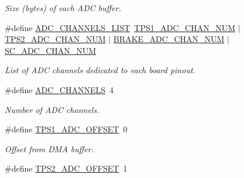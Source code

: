 \begin{DoxyCompactItemize}
\begin{DoxyCompactList}\small\item\em Size (bytes) of each A\-D\-C buffer. \end{DoxyCompactList}\item 
\hypertarget{group___board__model__group_ga8b6fbd5b46174be3b86bc1ab5daa9080}{\#define \hyperlink{group___board__model__group_ga8b6fbd5b46174be3b86bc1ab5daa9080}{A\-D\-C\-\_\-\-C\-H\-A\-N\-N\-E\-L\-S\-\_\-\-L\-I\-S\-T}~\hyperlink{group___board__model__group_ga99b2a7dadaf495e3c559a46440f9141f}{T\-P\-S1\-\_\-\-A\-D\-C\-\_\-\-C\-H\-A\-N\-\_\-\-N\-U\-M} $|$ \hyperlink{group___board__model__group_ga4cecb8c10512873904099a1a88d69ed3}{T\-P\-S2\-\_\-\-A\-D\-C\-\_\-\-C\-H\-A\-N\-\_\-\-N\-U\-M} $|$ \hyperlink{group___board__model__group_ga310547321c4a016c4ad19922920fadfd}{B\-R\-A\-K\-E\-\_\-\-A\-D\-C\-\_\-\-C\-H\-A\-N\-\_\-\-N\-U\-M} $|$ \hyperlink{group___board__model__group_ga564adb575db2620ac85e3abdd6a5bbaf}{S\-C\-\_\-\-A\-D\-C\-\_\-\-C\-H\-A\-N\-\_\-\-N\-U\-M}}\label{group___board__model__group_ga8b6fbd5b46174be3b86bc1ab5daa9080}

\begin{DoxyCompactList}\small\item\em List of A\-D\-C channels dedicated to each board pinout. \end{DoxyCompactList}\item 
\hypertarget{group___board__model__group_ga065dcfa648ca52ed6214008cb177de36}{\#define \hyperlink{group___board__model__group_ga065dcfa648ca52ed6214008cb177de36}{A\-D\-C\-\_\-\-C\-H\-A\-N\-N\-E\-L\-S}~4}\label{group___board__model__group_ga065dcfa648ca52ed6214008cb177de36}

\begin{DoxyCompactList}\small\item\em Number of A\-D\-C channels. \end{DoxyCompactList}\item 
\hypertarget{group___board__model__group_ga7ce02d79fba23321a377a26a963e2bdf}{\#define \hyperlink{group___board__model__group_ga7ce02d79fba23321a377a26a963e2bdf}{T\-P\-S1\-\_\-\-A\-D\-C\-\_\-\-O\-F\-F\-S\-E\-T}~0}\label{group___board__model__group_ga7ce02d79fba23321a377a26a963e2bdf}

\begin{DoxyCompactList}\small\item\em Offset from D\-M\-A buffer. \end{DoxyCompactList}\item 
\hypertarget{group___board__model__group_ga24019e59e805c7acf8f816e141d3d689}{\#define \hyperlink{group___board__model__group_ga24019e59e805c7acf8f816e141d3d689}{T\-P\-S2\-\_\-\-A\-D\-C\-\_\-\-O\-F\-F\-S\-E\-T}~1}\label{group___board__model__group_ga24019e59e805c7acf8f816e141d3d689}


\end{DoxyCompactItemize}
